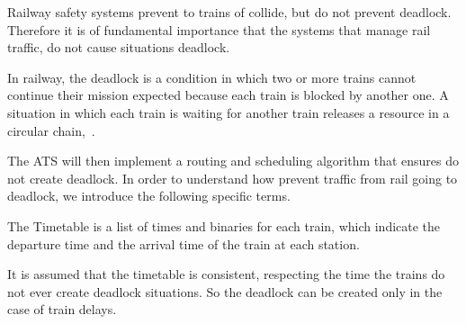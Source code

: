 \documentclass{ewic}
\begin{document}
			Railway safety systems prevent to trains of collide, but do not prevent deadlock. Therefore it is of fundamental importance that the systems that manage rail traffic, do not cause situations deadlock.
			
			In railway, the deadlock is a condition in which two or more trains cannot  continue their mission expected because each train is blocked by another one.
			A situation in which each train is waiting for another train releases a resource in a circular chain,~\cite{Pachl2012}.
			
			
			
			The ATS will then implement a routing and scheduling algorithm that ensures do not create deadlock. In order to understand how prevent traffic from rail going to deadlock, we introduce the following specific terms.
			
			
			The Timetable is a list of times and binaries for each train, which indicate the departure time and the arrival time of the train at each station.
			
			It is assumed that the timetable is consistent, respecting the time the trains do not ever create deadlock situations. So the deadlock can be created only in the case of train delays.
			
			
\end{document}
